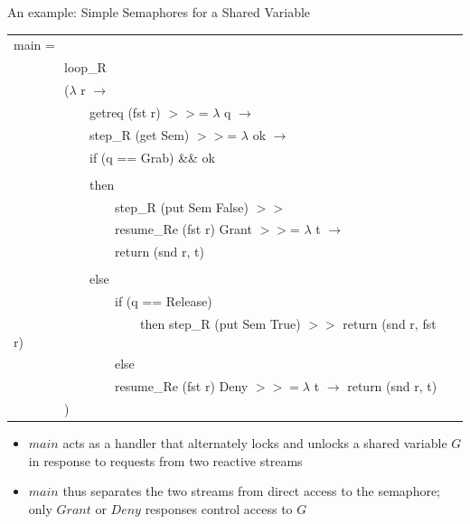 \documentclass{beamer}
\newcommand{\qs}[0]{\ \ \ \ }
\begin{document}
\begin{frame}{An example: Simple Semaphores for a Shared Variable}

\begin{scriptsize}

\begin{tabular}[t]{ll}

main =\\
\qs\qs loop\_R\\
\qs\qs($\lambda$ r $\rightarrow$\\
\qs\qs\qs           getreq (fst r) $>>$= $\lambda$ q $\rightarrow$\\
\qs\qs\qs           step\_R (get Sem) $>>$= $\lambda$ ok $\rightarrow$\\
\qs\qs\qs            if (q == Grab) \&\& ok\\
           \\
\qs\qs\qs            then\\
\qs\qs\qs\qs             step\_R (put Sem False) $>>$\\
\qs\qs\qs\qs             resume\_Re (fst r) Grant $>>$= $\lambda$ t $\rightarrow$\\
\qs\qs\qs\qs             return (snd r, t)\\
\\
\qs\qs\qs           else\\
\qs\qs\qs\qs             if (q == Release)\\
\qs\qs\qs\qs\qs             then step\_R (put Sem True) $>>$ return (snd r, fst r)\\
\qs\qs\qs\qs             else \\
\qs\qs\qs\qs               resume\_Re (fst r) Deny $>>= \lambda$ t $\rightarrow$ return (snd r, t)\\
\qs \qs        ) \\

\end{tabular}
\end{scriptsize}

\begin{onlinebox}{11cm}

\begin{scriptsize}
\begin{itemize}
\item{$main$ acts as a handler that alternately locks and unlocks a shared variable $G$ in response to requests from two reactive streams}

\item{$main$ thus separates the two streams from direct access to the semaphore; only $Grant$ or $Deny$ responses control access to $G$}

\end{itemize}
\end{scriptsize}

\end{onlinebox}

\end{frame}
\end{document}
